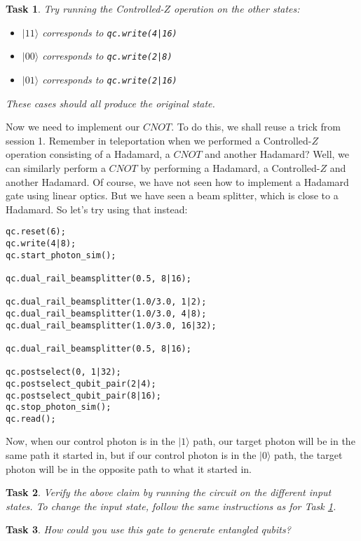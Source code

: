 \documentclass[twocolumn]{article}
\newtheorem{task}{Task}[section]
\begin{document}
\begin{task}
\label{task:cz}
Try running the Controlled-$Z$ operation on the other states:
\begin{itemize}
\item $|11\rangle$ corresponds to \texttt{qc.write(4|16)}
\item $|00\rangle$ corresponds to \texttt{qc.write(2|8)}
\item $|01\rangle$ corresponds to \texttt{qc.write(2|16)}
\end{itemize}

These cases should all produce the original state.
\end{task}

Now we need to implement our $CNOT$. To do this, we shall reuse a trick from session 1. Remember in teleportation when we performed a Controlled-$Z$ operation consisting of a Hadamard, a $CNOT$ and another Hadamard? Well, we can similarly perform a $CNOT$ by performing a Hadamard, a Controlled-$Z$ and another Hadamard. Of course, we have not seen how to implement a Hadamard gate using linear optics. But we have seen a beam splitter, which is close to a Hadamard. So let's try using that instead:

\begin{lstlisting}
qc.reset(6);
qc.write(4|8);
qc.start_photon_sim();

qc.dual_rail_beamsplitter(0.5, 8|16);

qc.dual_rail_beamsplitter(1.0/3.0, 1|2);
qc.dual_rail_beamsplitter(1.0/3.0, 4|8);
qc.dual_rail_beamsplitter(1.0/3.0, 16|32);

qc.dual_rail_beamsplitter(0.5, 8|16);

qc.postselect(0, 1|32);
qc.postselect_qubit_pair(2|4);
qc.postselect_qubit_pair(8|16);
qc.stop_photon_sim();
qc.read();
\end{lstlisting}

Now, when our control photon is in the $|1\rangle$ path, our target photon will be in the same path it started in, but if our control photon is in the $|0\rangle$ path, the target photon will be in the opposite path to what it started in.

\begin{task}
Verify the above claim by running the circuit on the different input states. To change the input state, follow the same instructions as for Task \ref{task:cz}.
\end{task}

\begin{task}
How could you use this gate to generate entangled qubits?
\end{task}
\end{document}
